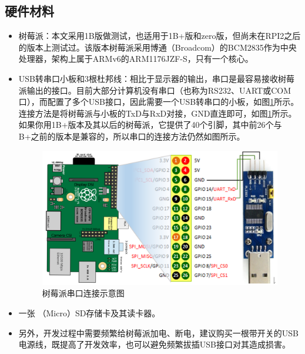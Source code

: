 \documentclass[main.tex]{subfiles}
\begin{document}
\begin{CJK*}{UTF8}{song}
\subsection{硬件材料}
\begin{itemize}
\item 树莓派：本文采用1B版做测试，也适用于1B+版和zero版，但尚未在RPI2之后的版本上测试过。该版本树莓派采用博通（Broadcom）的BCM2835作为中央处理器，架构上属于ARMv6的ARM1176JZF-S，只有一个核心。

\item USB转串口小板和3根杜邦线：相比于显示器的输出，串口是最容易接收树莓派输出的接口。目前大部分计算机没有串口（也称为RS232、UART或COM口），而配置了多个USB接口，因此需要一个USB转串口的小板，如图\ref{figure:1-1}所示。连接方法是将树莓派与小板的TxD与RxD对接，GND直连即可，如图\ref{figure:1-1}所示。如果你用1B+版本及其以后的树莓派，它提供了40个引脚，其中前26个与B+之前的版本是兼容的，所以串口的连接方法仍然如图所示。

\begin{figure}[htp]
\centering
\includegraphics[scale=0.4]{figures/1-1.png}
\caption{树莓派串口连接示意图}
\label{figure:1-1}
\end{figure}

\item 一张 （Micro）SD存储卡及其读卡器。

\item 另外，开发过程中需要频繁给树莓派加电、断电，建议购买一根带开关的USB电源线，既提高了开发效率，也可以避免频繁拔插USB接口对其造成损害。
\end{itemize}


\end{CJK*}
\end{document}
